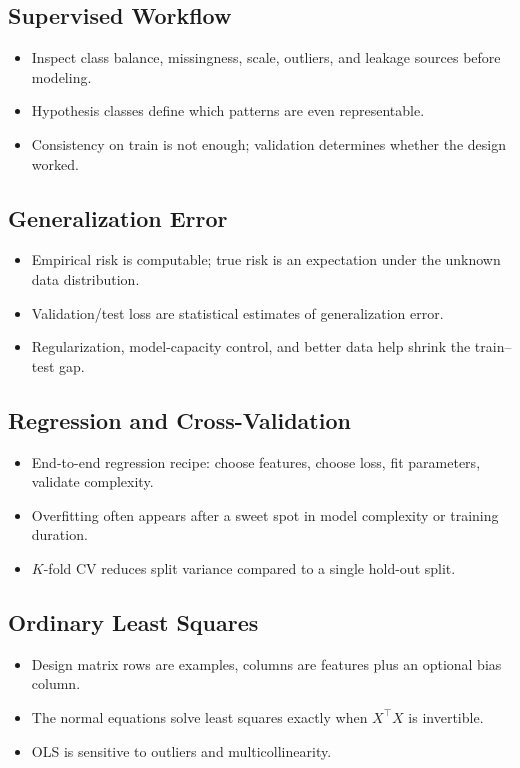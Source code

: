 \documentclass[10pt,twocolumn]{article}
\begin{document}
\subsection{Supervised Workflow}
\begin{itemize}
  \item Inspect class balance, missingness, scale, outliers, and leakage sources before modeling.
  \item Hypothesis classes define which patterns are even representable.
  \item Consistency on train is not enough; validation determines whether the design worked.
\end{itemize}

\subsection{Generalization Error}
\begin{itemize}
  \item Empirical risk is computable; true risk is an expectation under the unknown data distribution.
  \item Validation/test loss are statistical estimates of generalization error.
  \item Regularization, model-capacity control, and better data help shrink the train--test gap.
\end{itemize}

\subsection{Regression and Cross-Validation}
\begin{itemize}
  \item End-to-end regression recipe: choose features, choose loss, fit parameters, validate complexity.
  \item Overfitting often appears after a sweet spot in model complexity or training duration.
  \item $K$-fold CV reduces split variance compared to a single hold-out split.
\end{itemize}

\subsection{Ordinary Least Squares}
\begin{itemize}
  \item Design matrix rows are examples, columns are features plus an optional bias column.
  \item The normal equations solve least squares exactly when $X^\top X$ is invertible.
  \item OLS is sensitive to outliers and multicollinearity.
\end{itemize}
\end{document}
